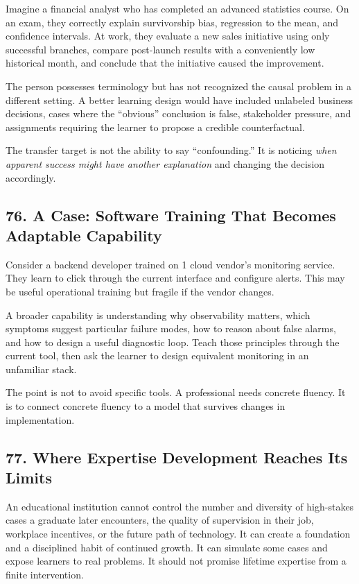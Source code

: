 Imagine a financial analyst who has completed an advanced statistics course. On an exam, they correctly explain survivorship bias, regression to the mean, and confidence intervals. At work, they evaluate a new sales initiative using only successful branches, compare post-launch results with a conveniently low historical month, and conclude that the initiative caused the improvement.

The person possesses terminology but has not recognized the causal problem in a different setting. A better learning design would have included unlabeled business decisions, cases where the ``obvious'' conclusion is false, stakeholder pressure, and assignments requiring the learner to propose a credible counterfactual.

The transfer target is not the ability to say ``confounding.'' It is noticing \emph{when apparent success might have another explanation} and changing the decision accordingly.

\subsection*{76. A Case: Software Training That Becomes Adaptable Capability}

Consider a backend developer trained on 1 cloud vendor's monitoring service. They learn to click through the current interface and configure alerts. This may be useful operational training but fragile if the vendor changes.

A broader capability is understanding why observability matters, which symptoms suggest particular failure modes, how to reason about false alarms, and how to design a useful diagnostic loop. Teach those principles through the current tool, then ask the learner to design equivalent monitoring in an unfamiliar stack.

The point is not to avoid specific tools. A professional needs concrete fluency. It is to connect concrete fluency to a model that survives changes in implementation.

\subsection*{77. Where Expertise Development Reaches Its Limits}

An educational institution cannot control the number and diversity of high-stakes cases a graduate later encounters, the quality of supervision in their job, workplace incentives, or the future path of technology. It can create a foundation and a disciplined habit of continued growth. It can simulate some cases and expose learners to real problems. It should not promise lifetime expertise from a finite intervention.

